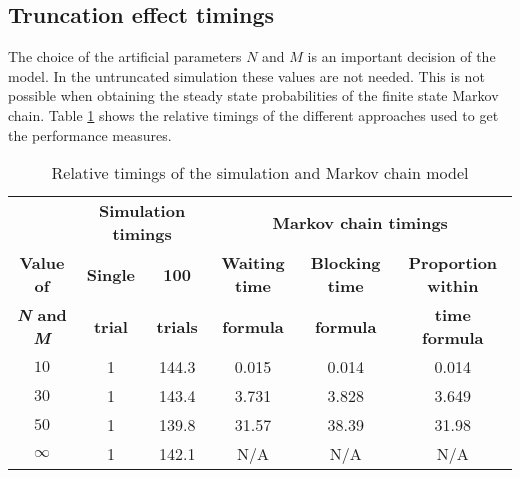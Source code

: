 \subsection{Truncation effect timings} \label{sec:truncation_effect}

The choice of the artificial parameters \(N\) and \(M\) is an important 
decision of the model.
In the untruncated simulation these values are not needed.
This is not possible when obtaining the steady state probabilities of the
finite state Markov chain.
Table \ref{tab:truncation_effect_timings} shows the relative timings of the
different approaches used to get the performance measures.

\begin{table}[h]
    \centering
    \begin{tabular}{c|cc|ccc}
        & \multicolumn{2}{c}{\textbf{Simulation timings}} & 
        \multicolumn{3}{c}{\textbf{Markov chain timings}} \\
        \textbf{Value of} & \textbf{Single} & \textbf{100} & 
        \textbf{Waiting time} & \textbf{Blocking time} & 
        \textbf{Proportion within} \\
        \textbf{\textit{N} and \textit{M}} & \textbf{trial} & \textbf{trials} & 
        \textbf{formula} & \textbf{formula} & \textbf{time formula} \\
        \hline
        \(10\) & 1 & 144.3 & 0.015 & 0.014 & 0.014 \\
        \hline
        \(30\) & 1 & 143.4 & 3.731 & 3.828 & 3.649 \\
        \hline
        \(50\) & 1 & 139.8 & 31.57 & 38.39 & 31.98 \\
        \hline
        \(\infty\) & 1 & 142.1 & N/A & N/A & N/A \\
    \end{tabular}
    \caption{Relative timings of the simulation and Markov chain model}
    \label{tab:truncation_effect_timings}
\end{table}
